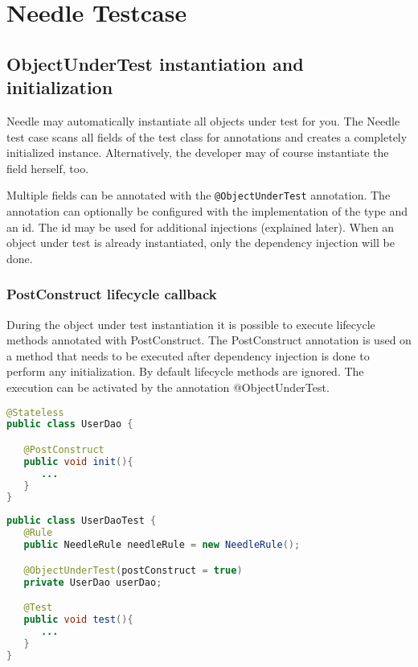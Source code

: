 \chapter{Needle Testcase}

\section{ObjectUnderTest instantiation and initialization}
\label{sec: ObjectUnderTest}

Needle may automatically instantiate all objects under test for you.
The Needle test case scans all fields of the test class for annotations and creates a completely initialized instance. Alternatively, the 
developer may of course instantiate the field herself, too.

Multiple fields can be annotated with the \verb|@ObjectUnderTest| annotation. The annotation can optionally be configured with the implementation of the type and an id.
The id may be used for additional injections (explained later). When an object under test is already instantiated, only the dependency injection will be done.

\subsection{PostConstruct lifecycle callback}
\label{sec:PostConstruct}

During the object under test instantiation it is possible to execute lifecycle methods annotated with PostConstruct. The PostConstruct annotation is used on a method that needs to be executed after dependency injection is done to perform any initialization. By default lifecycle methods are ignored. The execution can be activated by the annotation @ObjectUnderTest.

\begin{lstlisting}[language={JAVA},caption=PostConstruct]
@Stateless
public class UserDao {

   @PostConstruct
   public void init(){
      ...
   }
}
\end{lstlisting}

\begin{lstlisting}[language={JAVA},caption=PostConstruct Testcase]
public class UserDaoTest {
   @Rule
   public NeedleRule needleRule = new NeedleRule();

   @ObjectUnderTest(postConstruct = true)
   private UserDao userDao;

   @Test
   public void test(){
      ...
   }	
}
\end{lstlisting}

